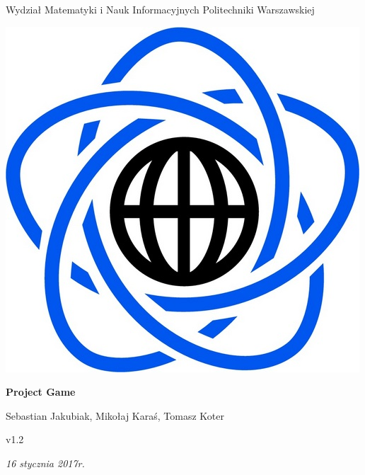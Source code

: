 \documentclass[11pt]{article}
\begin{document}
\begin{titlepage}
\centering

{\large Wydział Matematyki i Nauk Informacyjnych Politechniki Warszawskiej}

\vspace{1cm}
\includegraphics[scale=0.15]{../res/logo}
\vspace{3cm}

{\Huge\bfseries Project Game}

\vspace{1cm}

{\Large Sebastian Jakubiak, Mikołaj Karaś, Tomasz Koter}

\vspace{1cm}

{\large v1.2}

\vspace{1cm}

\vfill

{\itshape {\large 16 stycznia 2017r.}}
\end{titlepage}

\tableofcontents
\end{document}
